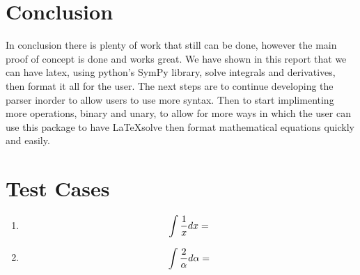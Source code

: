 \documentclass[english]{article}
\newcommand{\eval}[1]{\immediate\write18{python3 symtex.py '#1' > intermediate.txt}}
\begin{document}



\section{Conclusion}
In conclusion there is plenty of work that still can be done, however the main proof of concept is done and works great. We have shown in this report that we can have latex, using python's SymPy library, solve integrals and derivatives, then format it all for the user. The next steps are to continue developing the parser inorder to allow users to use more syntax. Then to start implimenting more operations, binary and unary, to allow for more ways in which the user can use this package to have \LaTeX solve then format mathematical equations quickly and easily.

\section{Test Cases}

\begin{enumerate}
  \item {$$ \intop{\frac{1}{x} dx} = \eval{\intop{frac{1}{x} dx}} $$}

  \item {$$ \intop{\frac{2}{\alpha} d\alpha} = \eval{\intop{frac{2}{alpha} dalpha}} $$}
\end{enumerate}
\end{document}

